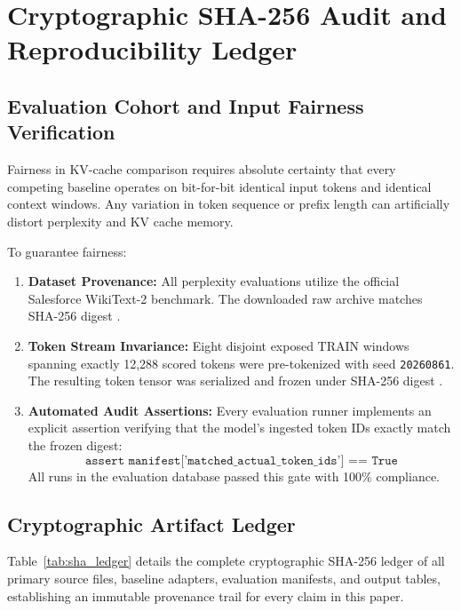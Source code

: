 \documentclass{article}
\begin{document}
\section{Cryptographic SHA-256 Audit and Reproducibility Ledger}
\label{app:audit}

\subsection{Evaluation Cohort and Input Fairness Verification}
Fairness in KV-cache comparison requires absolute certainty that every competing baseline operates on bit-for-bit identical input tokens and identical context windows. Any variation in token sequence or prefix length can artificially distort perplexity and KV cache memory.

To guarantee fairness:
\begin{enumerate}
    \item \textbf{Dataset Provenance:} All perplexity evaluations utilize the official Salesforce WikiText-2 benchmark. The downloaded raw archive matches SHA-256 digest \texttt{}.
    \item \textbf{Token Stream Invariance:} Eight disjoint exposed TRAIN windows spanning exactly 12,288 scored tokens were pre-tokenized with seed \texttt{20260861}. The resulting token tensor was serialized and frozen under SHA-256 digest \texttt{}.
    \item \textbf{Automated Audit Assertions:} Every evaluation runner implements an explicit assertion verifying that the model's ingested token IDs exactly match the frozen digest:
    \begin{equation}
    \texttt{assert manifest['matched\_actual\_token\_ids'] == True}
    \end{equation}
    All runs in the evaluation database passed this gate with 100\% compliance.
\end{enumerate}

\subsection{Cryptographic Artifact Ledger}
Table~\ref{tab:sha_ledger} details the complete cryptographic SHA-256 ledger of all primary source files, baseline adapters, evaluation manifests, and output tables, establishing an immutable provenance trail for every claim in this paper.
\end{document}
